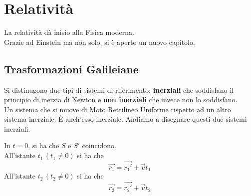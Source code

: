
\section{Relatività}
La relatività dà inisio alla Fisica moderna.\\
Grazie ad Einstein ma non solo, si è aperto un nuovo capitolo.

\subsection{Trasformazioni Galileiane}
Si distinugono due tipi di sistemi di riferimento:
\textbf{inerziali} che soddisfano il principio di inerzia di Newton e \textbf{non inerziali} che
invece non lo soddisfano.\\
Un sistema che si muove di Moto Rettilineo Uniforme rispetto ad un altro sistema inerziale. È 
anch'esso inerziale. Andiamo a disegnare questi due sistemi inerziali.
\begin{center}
\end{center}
In $t=0$, si ha che $S$ e $S'$ coincidono.\\
All'istante $t_1\,(t_1\neq0)$ si ha che
\begin{equation*}
  \vec{r_1} = \vec{r_1'} + \vec{v}t_1
\end{equation*}
All'istante $t_2\,(t_2\neq0)$ si ha che
\begin{equation*}
  \vec{r_2} = \vec{r_2'} + \vec{v}t_2
\end{equation*}
